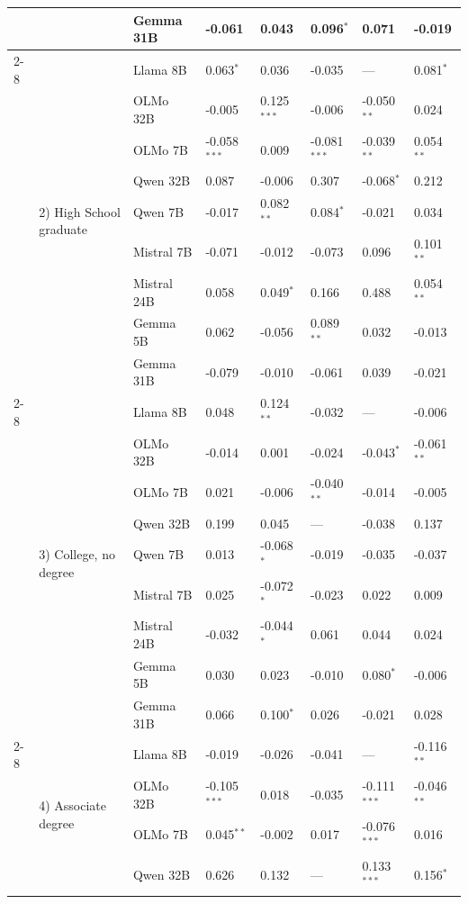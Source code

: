 \begin{longtable}[t]{llllllll}
 &  & Gemma 31B & -0.061 & 0.043 & 0.096$^{*}$ & 0.071 & -0.019 \\
\cline{2-8}
 & \multirow[t]{9}{*}{2) High School graduate} & Llama 8B & 0.063$^{*}$ & 0.036 & -0.035 & --- & 0.081$^{*}$ \\
 &  & OLMo 32B & -0.005 & 0.125$^{***}$ & -0.006 & -0.050$^{**}$ & 0.024 \\
 &  & OLMo 7B & -0.058$^{***}$ & 0.009 & -0.081$^{***}$ & -0.039$^{**}$ & 0.054$^{**}$ \\
 &  & Qwen 32B & 0.087 & -0.006 & 0.307 & -0.068$^{*}$ & 0.212 \\
 &  & Qwen 7B & -0.017 & 0.082$^{**}$ & 0.084$^{*}$ & -0.021 & 0.034 \\
 &  & Mistral 7B & -0.071 & -0.012 & -0.073 & 0.096 & 0.101$^{**}$ \\
 &  & Mistral 24B & 0.058 & 0.049$^{*}$ & 0.166 & 0.488 & 0.054$^{**}$ \\
 &  & Gemma 5B & 0.062 & -0.056 & 0.089$^{**}$ & 0.032 & -0.013 \\
 &  & Gemma 31B & -0.079 & -0.010 & -0.061 & 0.039 & -0.021 \\
\cline{2-8}
 & \multirow[t]{9}{*}{3) College, no degree} & Llama 8B & 0.048 & 0.124$^{**}$ & -0.032 & --- & -0.006 \\
 &  & OLMo 32B & -0.014 & 0.001 & -0.024 & -0.043$^{*}$ & -0.061$^{**}$ \\
 &  & OLMo 7B & 0.021 & -0.006 & -0.040$^{**}$ & -0.014 & -0.005 \\
 &  & Qwen 32B & 0.199 & 0.045 & --- & -0.038 & 0.137 \\
 &  & Qwen 7B & 0.013 & -0.068$^{*}$ & -0.019 & -0.035 & -0.037 \\
 &  & Mistral 7B & 0.025 & -0.072$^{*}$ & -0.023 & 0.022 & 0.009 \\
 &  & Mistral 24B & -0.032 & -0.044$^{*}$ & 0.061 & 0.044 & 0.024 \\
 &  & Gemma 5B & 0.030 & 0.023 & -0.010 & 0.080$^{*}$ & -0.006 \\
 &  & Gemma 31B & 0.066 & 0.100$^{*}$ & 0.026 & -0.021 & 0.028 \\
\cline{2-8}
 & \multirow[t]{9}{*}{4) Associate degree} & Llama 8B & -0.019 & -0.026 & -0.041 & --- & -0.116$^{**}$ \\
 &  & OLMo 32B & -0.105$^{***}$ & 0.018 & -0.035 & -0.111$^{***}$ & -0.046$^{**}$ \\
 &  & OLMo 7B & 0.045$^{**}$ & -0.002 & 0.017 & -0.076$^{***}$ & 0.016 \\
 &  & Qwen 32B & 0.626 & 0.132 & --- & 0.133$^{***}$ & 0.156$^{*}$ \\

\end{longtable}
